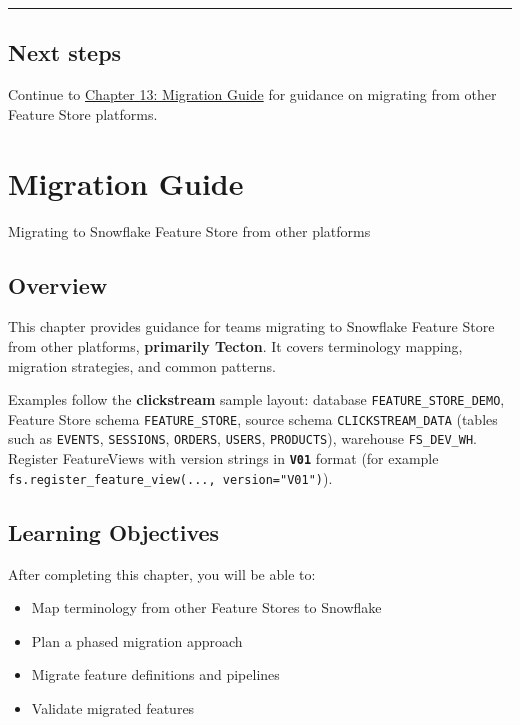 \documentclass[
  letterpaper,
  DIV=11,
  numbers=noendperiod]{scrreprt}
\providecommand{\tightlist}{%
  \setlength{\itemsep}{0pt}\setlength{\parskip}{0pt}}\usepackage{longtable,booktabs,array}
\begin{document}
\begin{center}\rule{0.5\linewidth}{0.5pt}\end{center}

\hypertarget{next-steps-12}{%
\section{Next steps}\label{next-steps-12}}

Continue to \protect\hyperlink{migration-guide}{Chapter 13: Migration
Guide} for guidance on migrating from other Feature Store platforms.

\hypertarget{migration-guide}{%
\chapter{Migration Guide}\label{migration-guide}}

Migrating to Snowflake Feature Store from other platforms

\hfill\break

\hypertarget{overview-13}{%
\section{Overview}\label{overview-13}}

This chapter provides guidance for teams migrating to Snowflake Feature
Store from other platforms, \textbf{primarily Tecton}. It covers
terminology mapping, migration strategies, and common patterns.

Examples follow the \textbf{clickstream} sample layout: database
\texttt{FEATURE\_STORE\_DEMO}, Feature Store schema
\texttt{FEATURE\_STORE}, source schema \texttt{CLICKSTREAM\_DATA}
(tables such as \texttt{EVENTS}, \texttt{SESSIONS}, \texttt{ORDERS},
\texttt{USERS}, \texttt{PRODUCTS}), warehouse \texttt{FS\_DEV\_WH}.
Register FeatureViews with version strings in \textbf{\texttt{V01}}
format (for example
\texttt{fs.register\_feature\_view(...,\ version="V01")}).

\hypertarget{learning-objectives-12}{%
\section{Learning Objectives}\label{learning-objectives-12}}

After completing this chapter, you will be able to:

\begin{itemize}
\tightlist
\item
  Map terminology from other Feature Stores to Snowflake
\item
  Plan a phased migration approach
\item
  Migrate feature definitions and pipelines
\item
  Validate migrated features
\end{itemize}
\end{document}
